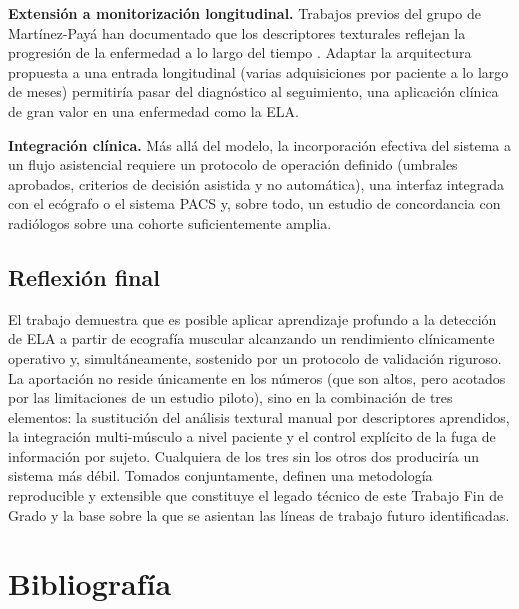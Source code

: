 \documentclass[12pt]{extarticle}
\numberwithin{equation}{section}
\begin{document}
\begin{refsection}
\textbf{Extensión a monitorización longitudinal.} Trabajos previos del grupo de Martínez-Payá han documentado que los descriptores texturales reflejan la progresión de la enfermedad a lo largo del tiempo \cite{martinezpaya2018monitoring}. Adaptar la arquitectura propuesta a una entrada longitudinal (varias adquisiciones por paciente a lo largo de meses) permitiría pasar del diagnóstico al seguimiento, una aplicación clínica de gran valor en una enfermedad como la ELA.

\textbf{Integración clínica.} Más allá del modelo, la incorporación efectiva del sistema a un flujo asistencial requiere un protocolo de operación definido (umbrales aprobados, criterios de decisión asistida y no automática), una interfaz integrada con el ecógrafo o el sistema PACS y, sobre todo, un estudio de concordancia con radiólogos sobre una cohorte suficientemente amplia.

\subsection{Reflexión final}\label{subsec:conc-cierre}

El trabajo demuestra que es posible aplicar aprendizaje profundo a la detección de ELA a partir de ecografía muscular alcanzando un rendimiento clínicamente operativo y, simultáneamente, sostenido por un protocolo de validación riguroso. La aportación no reside únicamente en los números (que son altos, pero acotados por las limitaciones de un estudio piloto), sino en la combinación de tres elementos: la sustitución del análisis textural manual por descriptores aprendidos, la integración multi-músculo a nivel paciente y el control explícito de la fuga de información por sujeto. Cualquiera de los tres sin los otros dos produciría un sistema más débil. Tomados conjuntamente, definen una metodología reproducible y extensible que constituye el legado técnico de este Trabajo Fin de Grado y la base sobre la que se asientan las líneas de trabajo futuro identificadas.

\newpage

\section{Bibliograf\'ia} \label{sec:bibliography}

\printbibliography[heading=none]

\end{refsection}
\newpage
\end{document}
